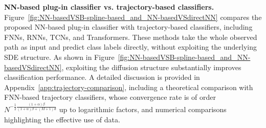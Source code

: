 \documentclass{article}
\theoremstyle{plain}
\theoremstyle{definition}
\theoremstyle{remark}
\begin{document}
\textbf{NN-based plug-in classifier vs. trajectory-based classifiers.}
Figure~\ref{fig:NN-basedVSB-spline-based_and_NN-basedVSdirectNN} compares the proposed NN-based plug-in classifier with trajectory-based classifiers, including FNNs, RNNs, TCNs, and Transformers. These methods take the whole observed path as input and predict class labels directly, without exploiting the underlying SDE structure. As shown in Figure~\ref{fig:NN-basedVSB-spline-based_and_NN-basedVSdirectNN}, exploiting the diffusion structure substantially improves classification performance. A detailed discussion is provided in Appendix~\ref{app:trajectory-comparison}, including a theoretical comparison with FNN-based trajectory classifiers, whose convergence rate is of order $N^{-\frac{1}{2}\frac{(1+\alpha)\beta}{(1+\alpha)\beta+(M+1)d}}$ up to logarithmic factors, and numerical comparisons highlighting the effective use of data.

\end{document}
